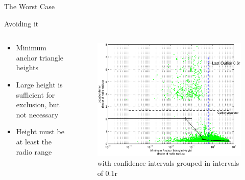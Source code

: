 \documentclass{beamer}
\begin{document}
\begin{frame}{The Worst Case}
\begin{block}{Avoiding it}
\begin{columns}
	\begin{column}{0.3\textwidth}
		\begin{itemize}
			\item Minimum anchor triangle heights
			\item Large height is sufficient for exclusion, but not necessary
			\item Height must be at least the radio range
		\end{itemize}
		\vfil
	\end{column}
	\begin{column}{0.7\textwidth}
		\begin{figure}
			  \centering
				\includegraphics[width=\textwidth]{HeightIndicator_square}
				\caption{with confidence intervals grouped in intervals of 0.1r}	
		\end{figure}
	\end{column}
\end{columns}
\end{block}
\end{frame}
\end{document}
